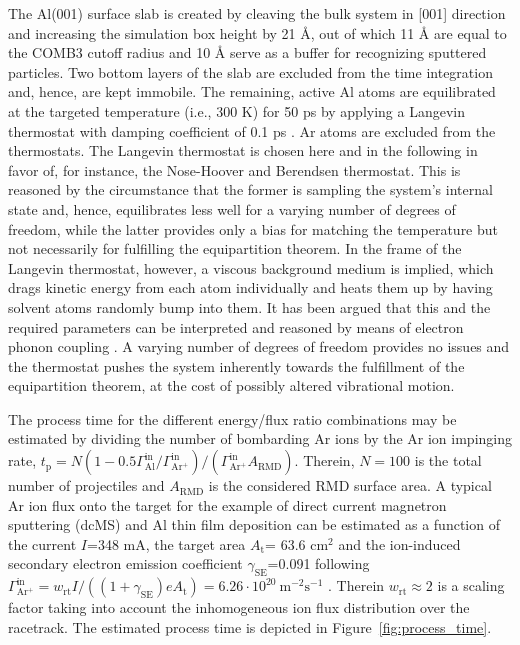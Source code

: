 \documentclass[12pt,a4paper,preprint,superscriptaddress]{revtex4-1}
\begin{document}
The Al(001) surface slab is created by cleaving the bulk system in [001] direction and increasing the simulation box height by 21 \r A, out of which 11 \r A are equal to the COMB3 cutoff radius and 10 \r A serve as a buffer for recognizing sputtered particles. Two bottom layers of the slab are excluded from the time integration and, hence, are kept immobile. The remaining, active Al atoms are equilibrated at the targeted temperature (i.e., 300 K) for 50 ps by applying a Langevin thermostat with damping coefficient of 0.1 ps \citep{schneider1978molecular,dunweg1991brownian}. Ar atoms are excluded from the thermostats. The Langevin thermostat is chosen here and in the following in favor of, for instance, the Nose-Hoover and Berendsen thermostat. This is reasoned by the circumstance that the former is sampling the system's internal state and, hence, equilibrates less well for a varying number of degrees of freedom, while the latter provides only a bias for matching the temperature but not necessarily for fulfilling the equipartition theorem. In the frame of the Langevin thermostat, however, a viscous background medium is implied, which drags kinetic energy from each atom individually and heats them up by having solvent atoms randomly bump into them. It has been argued that this and the required parameters can be interpreted and reasoned by means of electron phonon coupling \citep{hou2000deposition}. A varying number of degrees of freedom provides no issues and the thermostat pushes the system inherently towards the fulfillment of the equipartition theorem, at the cost of possibly altered vibrational motion. 

The process time for the different energy/flux ratio combinations may be estimated by dividing the number of bombarding Ar ions by the Ar ion impinging rate, $t_\text{p} = N (1-0.5\Gamma_\mathrm{Al}^\mathrm{in}/\Gamma_\mathrm{Ar^+}^\mathrm{in}) / (\Gamma_\mathrm{Ar^+}^\mathrm{in}A_\mathrm{RMD})$. Therein, $N=100$ is the total number of projectiles and $A_\mathrm{RMD}$ is the considered RMD surface area. A typical Ar ion flux onto the target for the example of direct current magnetron sputtering (dcMS) and Al thin film deposition \cite{trieschmann2018combined} can be estimated as a function of the current $I$=348 mA, the target area $A_\mathrm{t}$= 63.6 cm$^2$ and the ion-induced secondary electron emission coefficient $\gamma_\mathrm{SE}$=0.091 following $\Gamma_\mathrm{Ar^+}^\mathrm{in} = w_\mathrm{rt} I/((1+\gamma_\mathrm{SE})eA_\mathrm{t})=6.26 \cdot 10^{20}~\mathrm{m}^{-2}\mathrm{s}^{-1}$ \citep{trieschmann2018combined,DEPLA20064329}. Therein $w_\mathrm{rt} \approx 2$ is a scaling factor taking into account the inhomogeneous ion flux distribution over the racetrack. The estimated process time is depicted in Figure~\ref{fig:process_time}.
\end{document}
